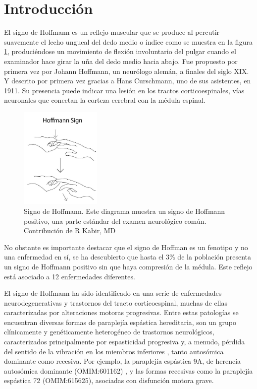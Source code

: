\section{Introducción}
El signo de Hoffmann es un reflejo muscular que se produce al percutir suavemente el lecho ungueal del dedo medio o índice como se muestra en la figura \ref{fig:Hoffman_sign}, produciéndose un movimiento de flexión involuntario del pulgar cuando el examinador hace girar la uña del dedo medio hacia abajo. Fue propuesto por primera vez por Johann Hoffmann, un neurólogo alemán, a finales del siglo XIX. Y descrito por primera vez gracias a Hans Curschmann, uno de sus asistentes, en 1911\cite{ BENDHEIM}. Su presencia puede indicar una lesión en los tractos corticoespinales, vías neuronales que conectan la corteza cerebral con la médula espinal. 


\begin{figure}[h!]
	\includegraphics[width=0.35\textwidth]{figures/Kabir_Hoffmann__Sign.jpg}
	\caption{Signo de Hoffmann. Este diagrama muestra un signo de Hoffmann positivo, una parte estándar del examen neurológico común. Contribución de R Kabir, MD}
	\label{fig:Hoffman_sign}
\end{figure}


No obstante es importante destacar que el signo de Hoffman es un fenotipo y no una enfermedad en sí, se ha descubierto que hasta el 3\% de la población presenta un signo de Hoffmann positivo sin que haya compresión de la médula. Este reflejo está asociado a 12 enfermedades diferentes\cite{whitney}.

El signo de Hoffmann ha sido identificado en una serie de enfermedades neurodegenerativas y trastornos del tracto corticoespinal, muchas de ellas caracterizadas por alteraciones motoras progresivas. Entre estas patologías se encuentran diversas formas de paraplejía espástica hereditaria, son un grupo clínicamente y genéticamente heterogéneo de trastornos neurológicos, caracterizados principalmente por espasticidad progresiva y, a menudo, pérdida del sentido de la vibración en los miembros inferiores \cite{Esteves2014}, tanto autosómica dominante como recesiva. Por ejemplo, la paraplejía espástica 9A, de herencia autosómica dominante (OMIM:601162) \cite{10.1093/brain/awv143}, y las formas recesivas como la paraplejía espástica 72 (OMIM:615625), asociadas con disfunción motora grave.

